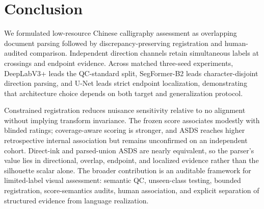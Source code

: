 \section{Conclusion}
\label{sec:conclusion}

We formulated low-resource Chinese calligraphy assessment as overlapping
document parsing followed by discrepancy-preserving registration and
human-audited comparison. Independent direction channels retain simultaneous
labels at crossings and endpoint evidence. Across matched three-seed
experiments, DeepLabV3+ leads the QC-standard split, SegFormer-B2 leads
character-disjoint direction parsing, and U-Net leads strict endpoint
localization, demonstrating that architecture choice depends on both target
and generalization protocol.

Constrained registration reduces nuisance sensitivity relative to no
alignment without implying transform invariance. The frozen score associates
modestly with blinded ratings; coverage-aware scoring is stronger, and ASDS
reaches higher retrospective internal association but remains unconfirmed on
an independent cohort. Direct-ink and parsed-union ASDS are nearly equivalent,
so the parser's value lies in directional, overlap, endpoint, and localized
evidence rather than the silhouette scalar alone. The broader
contribution is an auditable framework for limited-label visual assessment:
semantic QC, unseen-class testing, bounded registration, score-semantics
audits, human association, and explicit separation of structured evidence
from language realization.
